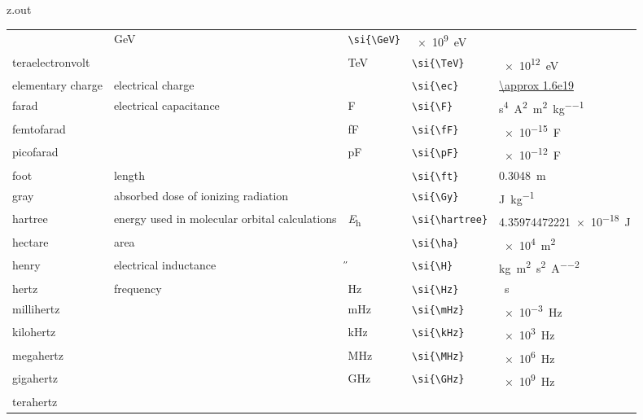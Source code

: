 \begin{VerbatimOut}{z.out}
{\begin{longtable}{@{}P{1.4in}P{1in}llP{1.8in}@{}}
      \ditto&
      \si{\GeV}&
      \verb+\si{\GeV}+&
      \SI{e9}{\eV}\\
    \quad teraelectronvolt&
      \ditto&
      \si{\TeV}&
      \verb+\si{\TeV}+&
      \SI{e12}{\eV}\\
    \vsp
    elementary charge&
      electrical charge&
      \si{\ec}&
      \verb+\si{\ec}+&
      \href{https://en.wikipedia.org/wiki/Elementary_charge}{\SI{\approx 1.6e19}{\C}}\\
    \vsp
    farad&
      electrical capacitance&
      \si{\F}&
      \verb+\si{\F}+&
      \si{\s\tothe{4}\A\squared\per\m\squared\per\kg}\\
    \quad femtofarad&
      \ditto&
      \si{\fF}&
      \verb+\si{\fF}+&
      \SI{e-15}{\F}\\
    \quad picofarad&
      \ditto&
      \si{\pF}&
      \verb+\si{\pF}+&
      \SI{e-12}{\F}\\
    \vsp
    foot&
      length&
      \si{\ft}&
      \verb+\si{\ft}+&
      \SI{0.3048}{\m}\\  %
    \vsp
    gray&
      absorbed dose of ionizing radiation&
      \si{\Gy}&
      \verb+\si{\Gy}+&
      \si{\J\per\kg}\\
    \vsp
    hartree&
      energy used in molecular orbital calculations&
      \si{\hartree}&
      \verb+\si{\hartree}+&
      \SI{4.35974472221e-18}{\joule}\\
    \vsp
    hectare&
      area&
      \si{\ha}&
      \verb+\si{\ha}+&
      \SI{e4}{\m\squared}\\
    \vsp
    henry&
      electrical inductance&
      \si{\H}&
      \verb+\si{\H}+&
      \si{\kg\m\squared\per\s\squared\per\A\squared}\\
    \vsp
    hertz&
      frequency&
      \si{\Hz}&
      \verb+\si{\Hz}+&
      \si{\per\s}\\
    \quad millihertz&
      \ditto&
      \si{\mHz}&
      \verb+\si{\mHz}+&
      \SI{e-3}{\Hz}\\
    \quad kilohertz&
      \ditto&
      \si{\kHz}&
      \verb+\si{\kHz}+&
      \SI{e3}{\Hz}\\
    \quad megahertz&
      \ditto&
      \si{\MHz}&
      \verb+\si{\MHz}+&
      \SI{e6}{\Hz}\\
    \quad gigahertz&
      \ditto&
      \si{\GHz}&
      \verb+\si{\GHz}+&
      \SI{e9}{\Hz}\\
    \quad terahertz&
      \ditto&

\end{longtable}}
\end{VerbatimOut}
